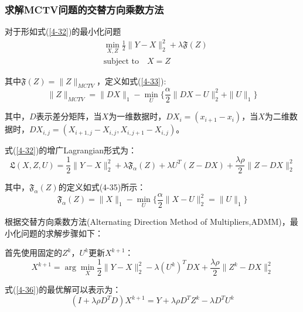 \documentclass[12pt]{article}
\begin{document}
\subsubsection{求解MCTV问题的交替方向乘数方法}
对于形如式(\ref{4-32})的最小化问题
\begin{equation}\label{4-32}
\begin{aligned}
&\min_{X,Z}\frac{1}{2}\parallel Y-X \parallel_2^2+\lambda\mathfrak{F}(Z)\\
&\text{subject to} \quad X=Z
\end{aligned}
\end{equation}
\par
其中$\mathfrak{F}(Z)=\parallel Z \parallel_{MCTV}$，定义如式(\ref{4-33}):
\begin{equation}\label{4-33}
\parallel Z \parallel_{MCTV}=\parallel DX \parallel_1-\min_U\{\frac{\alpha}{2}\parallel DX-U \parallel_2^2+\parallel U \parallel_1\}
\end{equation}
\par
其中，$D$表示差分矩阵，当$X$为一维数据时，$DX_i=(x_{i+1}-x_i)$，当$X$为二维数据时，$DX_{i,j}=(X_{i+1,j}-X_{i,j},X_{i,j+1}-X_{i,j})$。
\par
式(\ref{4-32})的增广Lagrangian形式为：
\begin{equation}\label{4-34}
\mathfrak{L}(X,Z,U)=\frac{1}{2}\parallel Y-X \parallel_2^2+\lambda \mathfrak{F}_{\alpha}(Z)+\lambda U^T(Z-DX)+\frac{\lambda \rho}{2}\parallel Z-DX \parallel_2^2
\end{equation}
\par
其中，$\mathfrak{F}_{\alpha}(Z)$的定义如式(4-35)所示：
\begin{equation}\label{4-35}
\mathfrak{F}_{\alpha}(Z)=\parallel X \parallel_1-\min_U\{\frac{\alpha}{2}\parallel X-U \parallel_2^2=\parallel U \parallel_1\}
\end{equation}
\par
根据交替方向乘数方法(Alternating Direction Method of Multipliers,ADMM)，最小化问题的求解步骤如下：
\par
首先使用固定的$Z^k$，$U^k$更新$X^{k+1}$：
\begin{equation}\label{4-36}
X^{k+1}=\arg\min_X \frac{1}{2}\parallel Y-X \parallel_2^2-\lambda(U^k)^TDX+\frac{\lambda\rho}{2}\parallel Z^k-DX \parallel_2^2
\end{equation}
\par
式(\ref{4-36})的最优解可以表示为：
\begin{equation}\label{4-37}
(I+\lambda\rho D^TD)X^{k+1}=Y+\lambda\rho D^T Z^k-\lambda D^T U^k
\end{equation}
\end{document}

